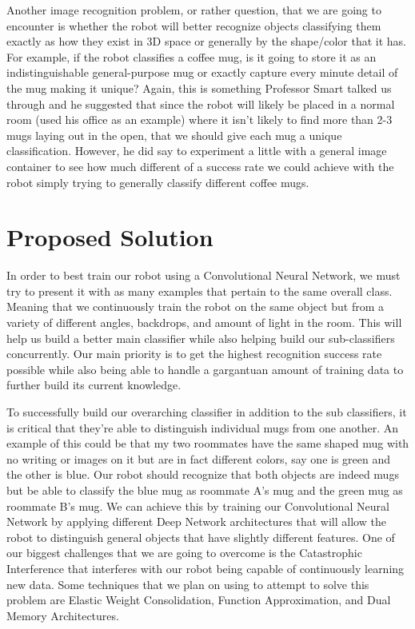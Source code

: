 \documentclass[a4paper, 10pt]{article}
\begin{document}
Another image recognition problem, or rather question, that we are going to encounter is whether the robot will better recognize objects classifying them exactly as how they exist in 3D space or generally by the shape/color that it has. For example, if the robot classifies a coffee mug, is it going to store it as an indistinguishable general-purpose mug or exactly capture every minute detail of the mug making it unique? Again, this is something Professor Smart talked us through and he suggested that since the robot will likely be placed in a normal room (used his office as an example) where it isn’t likely to find more than 2-3 mugs laying out in the open, that we should give each mug a unique classification. However, he did say to experiment a little with a general image container to see how much different of a success rate we could achieve with the robot simply trying to generally classify different coffee mugs.
\section{Proposed Solution}
In order to best train our robot using a Convolutional Neural Network, we must try to present it with as many examples that pertain to the same overall class. Meaning that we continuously train the robot on the same object but from a variety of different angles, backdrops, and amount of light in the room. This will help us build a better main classifier while also helping build our sub-classifiers concurrently. Our main priority is to get the highest recognition success rate possible while also being able to handle a gargantuan amount of training data to further build its current knowledge. 

To successfully build our overarching classifier in addition to the sub classifiers, it is critical that they’re able to distinguish individual mugs from one another. An example of this could be that my two roommates have the same shaped mug with no writing or images on it but are in fact different colors, say one is green and the other is blue. Our robot should recognize that both objects are indeed mugs but be able to classify the blue mug as roommate A’s mug and the green mug as roommate B’s mug. We can achieve this by training our Convolutional Neural Network by applying different Deep Network architectures that will allow the robot to distinguish general objects that have slightly different features. One of our biggest challenges that we are going to overcome is the Catastrophic Interference that interferes with our robot being capable of continuously learning new data. Some techniques that we plan on using to attempt to solve this problem are Elastic Weight Consolidation, Function Approximation, and Dual Memory Architectures.
\end{document}
